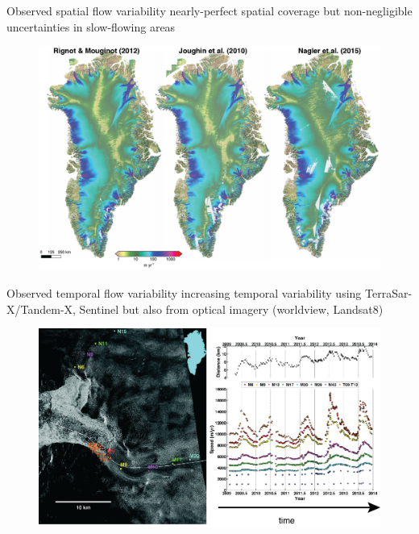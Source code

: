 \documentclass[hide notes,intlimits]{beamer}
\begin{document}
\begin{frame}{Observed spatial flow variability}
  nearly-perfect spatial coverage but non-negligible uncertainties in slow-flowing areas
  \begin{figure}
    \includegraphics[height=.7\textheight]{greenland-sar-3}
 \end{figure}
\end{frame}

\begin{frame}{Observed temporal flow variability}
  increasing temporal variability using TerraSar-X/Tandem-X, Sentinel but also from optical imagery (worldview, Landsat8)
  \begin{figure}
    \includegraphics[height=.7\textheight]{joughin-2014-collage}
 \end{figure}
\end{frame}
\end{document}
